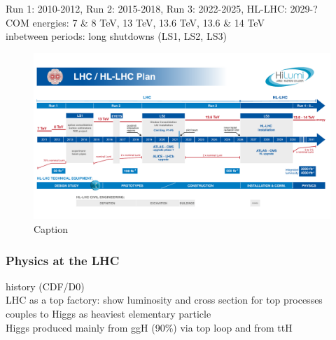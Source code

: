 \documentclass[../thesis.tex]{subfiles}
\begin{document}
Run 1: 2010-2012, Run 2: 2015-2018, Run 3: 2022-2025, HL-LHC: 2029-?\\
COM energies: 7 \& 8 TeV, 13 TeV, 13.6 TeV, 13.6 \& 14 TeV\\


inbetween periods: long shutdowns (LS1, LS2, LS3)\\

\begin{figure}[!htbp]
\begin{center}
\includegraphics[width=\linewidth]{fig/lhc_hl_lhc.pdf}
\caption[Caption]{\label{fig:lhc:hl_lhc}Caption \citep{lhc:hl_lhc}}
\end{center}
\end{figure}

\subsubsection*{Physics at the LHC}
history (CDF/D0)\\
LHC as a top factory: show luminosity and cross section for top processes\\
couples to Higgs as heaviest elementary particle\\
Higgs produced mainly from ggH (90\%) via top loop and from ttH\\
\end{document}
